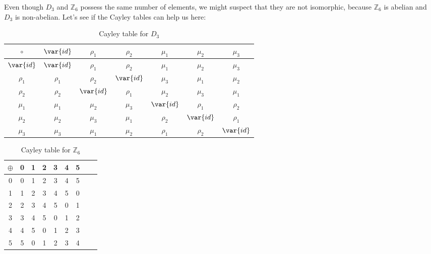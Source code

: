 
\begin{example}\label{example:isomorph:not_isomorph_abelian}
Even though $D_3$ and ${\mathbb Z}_6$ possess the same number of elements, we might suspect that they are not isomorphic, because ${\mathbb Z}_6$ is abelian and $D_3$ is non-abelian.  Let's see if the  Cayley tables can help us here:

\begin{table}[H]
{\small
\begin{center}
\begin{tabular}{c|cccccc}
$\circ$  & $\var{id}$     & $\rho_1$ & $\rho_2$ & $\mu_1$ & $\mu_2$ & $\mu_3$ \\
\hline
$\var{id}$     & $\var{id}$     & $\rho_1$ & $\rho_2$ & $\mu_1$ & $\mu_2$ & $\mu_3$ \\
$\rho_1$ & $\rho_1$ & $\rho_2$ & $\var{id}$     & $\mu_3$ & $\mu_1$ & $\mu_2$ \\
$\rho_2$ & $\rho_2$ & $\var{id}$     & $\rho_1$ & $\mu_2$ & $\mu_3$ & $\mu_1$ \\
$\mu_1$  & $\mu_1$  & $\mu_2$  & $\mu_3$  & $\var{id}$    & $\rho_1$& $\rho_2$\\
$\mu_2$  & $\mu_2$  & $\mu_3$  & $\mu_1$  & $\rho_2$& $\var{id}$    & $\rho_1$\\
$\mu_3$  & $\mu_3$  & $\mu_1$  & $\mu_2$  & $\rho_1$& $\rho_2$& $\var{id}$
\end{tabular}
\end{center}
}
\caption{Cayley table for $D_3$}
\label{D3_table}
\end{table}

\begin{table}[H]
\caption{Cayley table for ${\mathbb Z}_6$}
\label{Z6_add_table}
{\small
\begin{center}
\begin{tabular}{c|cccccccc}
$\oplus$ & 0 & 1 & 2 & 3 & 4 & 5  \\
\hline
0        & 0 & 1 & 2 & 3 & 4 & 5  \\
1       & 1 & 2 & 3 & 4 & 5 & 0  \\
2       & 2 & 3 & 4 & 5 & 0 & 1\\
3       & 3 & 4 & 5 & 0 & 1 & 2 \\
4       & 4 & 5 & 0 & 1 & 2 & 3 \\
5       & 5 & 0 & 1 & 2 & 3 & 4 \\


\end{tabular}
\end{center}}
\end{table}
\end{example}
